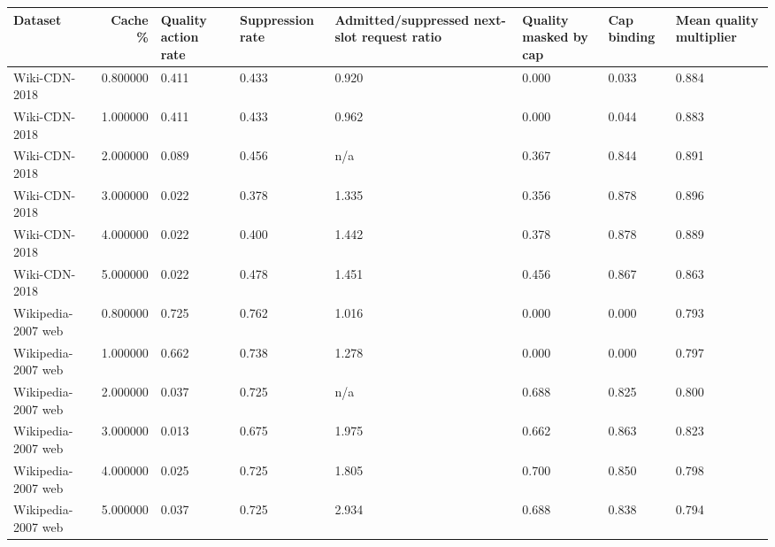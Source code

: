 \begin{tabular}{lrllllll}
\toprule
Dataset & Cache \% & Quality action rate & Suppression rate & Admitted/suppressed next-slot request ratio & Quality masked by cap & Cap binding & Mean quality multiplier \\
\midrule
Wiki-CDN-2018 & 0.800000 & 0.411 & 0.433 & 0.920 & 0.000 & 0.033 & 0.884 \\
Wiki-CDN-2018 & 1.000000 & 0.411 & 0.433 & 0.962 & 0.000 & 0.044 & 0.883 \\
Wiki-CDN-2018 & 2.000000 & 0.089 & 0.456 & n/a & 0.367 & 0.844 & 0.891 \\
Wiki-CDN-2018 & 3.000000 & 0.022 & 0.378 & 1.335 & 0.356 & 0.878 & 0.896 \\
Wiki-CDN-2018 & 4.000000 & 0.022 & 0.400 & 1.442 & 0.378 & 0.878 & 0.889 \\
Wiki-CDN-2018 & 5.000000 & 0.022 & 0.478 & 1.451 & 0.456 & 0.867 & 0.863 \\
Wikipedia-2007 web & 0.800000 & 0.725 & 0.762 & 1.016 & 0.000 & 0.000 & 0.793 \\
Wikipedia-2007 web & 1.000000 & 0.662 & 0.738 & 1.278 & 0.000 & 0.000 & 0.797 \\
Wikipedia-2007 web & 2.000000 & 0.037 & 0.725 & n/a & 0.688 & 0.825 & 0.800 \\
Wikipedia-2007 web & 3.000000 & 0.013 & 0.675 & 1.975 & 0.662 & 0.863 & 0.823 \\
Wikipedia-2007 web & 4.000000 & 0.025 & 0.725 & 1.805 & 0.700 & 0.850 & 0.798 \\
Wikipedia-2007 web & 5.000000 & 0.037 & 0.725 & 2.934 & 0.688 & 0.838 & 0.794 \\
\bottomrule
\end{tabular}
